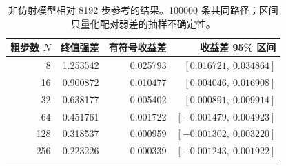 \begin{table}[htbp]\centering\small
\caption{非仿射模型相对 8192 步参考的结果。100000 条共同路径；区间只量化配对弱差的抽样不确定性。}\label{tab:results-na}
\begin{tabular}{rrrr}\toprule
粗步数 $N$ & 终值强差 & 有符号收益差 & 收益差 95\% 区间\\\midrule
8 & 1.253542 & 0.025793 & $[0.016721,\ 0.034864]$\\
16 & 0.900872 & 0.010477 & $[0.004046,\ 0.016908]$\\
32 & 0.638177 & 0.005402 & $[0.000891,\ 0.009914]$\\
64 & 0.451761 & 0.001722 & $[-0.001479,\ 0.004923]$\\
128 & 0.318537 & 0.000959 & $[-0.001302,\ 0.003220]$\\
256 & 0.223226 & 0.000339 & $[-0.001243,\ 0.001922]$\\
\bottomrule
\end{tabular}
\end{table}
